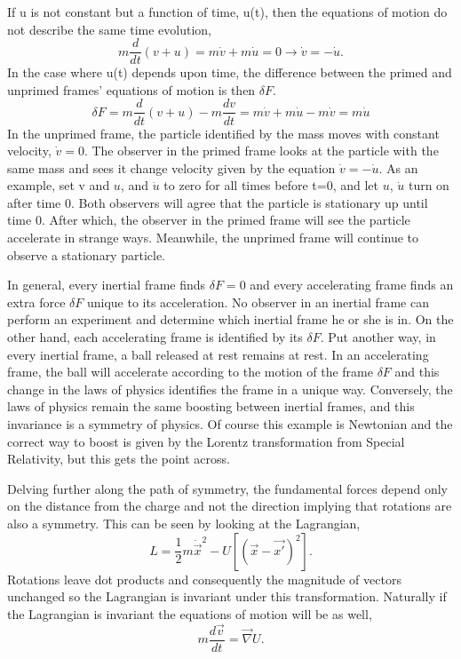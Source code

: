 \documentclass[12pt]{article}
\begin{document}
If u is not constant but a function of time, u(t), then the equations of motion do not describe the same time evolution,
\begin{equation}
m\frac{d}{dt}(v+u) = m\dot{v} + m\dot{u} = 0 \rightarrow \dot{v} = -\dot{u}.
\end{equation}
In the case where u(t) depends upon time, the difference between the primed and unprimed frames' equations of motion is then $\delta F$.
\begin{equation}
\delta F = m\frac{d}{dt}(v+u) - m\frac{dv}{dt} = m\dot{v} + m\dot{u} - m\dot{v} = m\dot{u}
\end{equation}
In the unprimed frame, the particle identified by the mass moves with constant velocity, $\dot{v} = 0$. The observer in the primed frame looks at the particle with the same mass and sees it change velocity given by the equation $\dot{v} = -\dot{u}$. As an example, set v and $u$, and $\dot{u}$ to zero for all times before t=0, and let $u$, $\dot{u}$ turn on after time 0. Both observers will agree that the particle is stationary up until time 0. After which, the observer in the primed frame will see the particle accelerate in strange ways. Meanwhile, the unprimed frame will continue to observe a stationary particle. 

In general, every inertial frame finds $\delta F = 0$ and every accelerating frame finds an extra force $\delta F$ unique to its acceleration. No observer in an inertial frame can perform an experiment and determine which inertial frame he or she is in. On the other hand, each accelerating frame is identified by its $\delta F$.  Put another way, in every inertial frame, a ball released at rest remains at rest. In an accelerating frame, the ball will accelerate according to the motion of the frame $\delta F$ and this change in the laws of physics identifies the frame in a unique way. Conversely, the laws of physics remain the same boosting between inertial frames, and this invariance is a symmetry of physics. Of course this example is Newtonian and the correct way to boost is given by the Lorentz transformation from Special Relativity, but this gets the point across.

Delving further along the path of symmetry, the fundamental forces depend only on the distance from the charge and not the direction implying that rotations are also a symmetry. This can be seen by looking at the Lagrangian, 
\begin{equation}
L = \frac{1}{2} m\dot{\vec{x}}^2 - U[(\vec{x} - \vec{x'})^2].
\end{equation}
Rotations leave dot products and consequently the magnitude of vectors unchanged so the Lagrangian is invariant under this transformation. Naturally if the Lagrangian is invariant the equations of motion will be as well,
\begin{equation}
\label{eq:symvec}
m\frac{d\vec{v}}{dt} = \vec{\nabla} U.
\end{equation}
\end{document}
